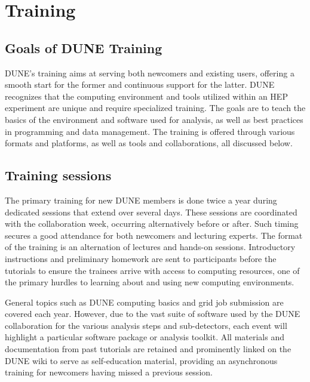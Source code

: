 \documentclass[../main-v1.tex]{subfiles}
\begin{document}

\section{Training }

\subsection{Goals of DUNE Training}
DUNE’s training aims at serving both newcomers and existing users, offering a smooth start for the former and continuous support for the latter. DUNE recognizes that the computing environment and tools utilized within an HEP experiment are unique and require specialized training. The goals are to teach the basics of the environment and software used for analysis, as well as best practices in programming and data management. The training is offered through various formats and platforms, as well as tools and collaborations, all discussed below. 


\subsection{Training sessions}
The primary training for new DUNE members is done twice a year during  dedicated sessions that extend over several days. These sessions are coordinated with the collaboration week, occurring alternatively before or after. Such timing secures a good attendance for both newcomers and lecturing experts.
The format of the training is an alternation of lectures and  hands-on sessions. Introductory instructions and preliminary homework are sent to participants before the tutorials to ensure the trainees arrive with access to computing resources, one of the primary hurdles to learning about and using new computing environments.


General topics such as DUNE computing basics and grid job submission are covered each year. However, due to the vast suite of software used by the DUNE collaboration for the various analysis steps and sub-detectors, each event will highlight a particular software package or analysis toolkit.  All materials and documentation from past tutorials are retained and prominently linked on the DUNE wiki to serve as self-education material, providing an asynchronous training for newcomers having missed a previous session.
\end{document}
